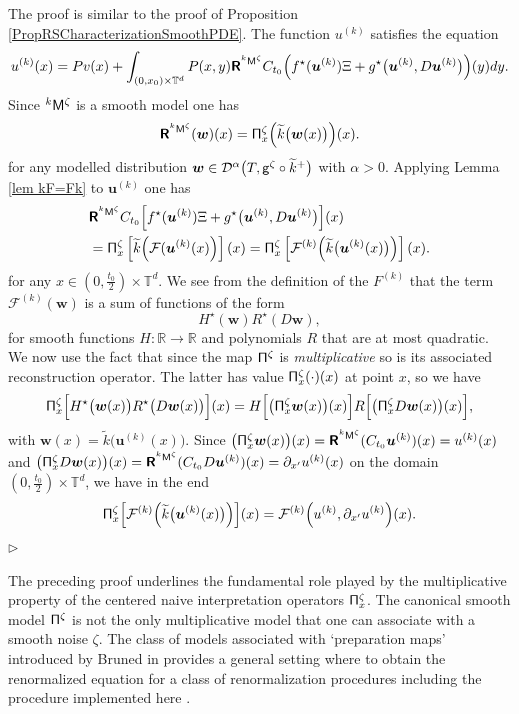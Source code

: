 \documentclass[10pt, reqno]{amsart}
\numberwithin{subsection}{section}
\numberwithin{subsubsection}{subsection}
\numberwithin{equation}{section} %
\newenvironment{Dem}[1][\unskip]{%
    \begin{list}{\hspace{1.15cm}{\sf \textbf{{\small Proof #1 --}}}}{%
        \setlength{\topsep}{0pt}%
        \setlength{\leftmargin}{0pt}%
        \setlength{\rightmargin}{0pt}%
        \setlength{\listparindent}{0pt}%
        \setlength{\itemindent}{0pt}%
        \setlength{\parsep}{0pt}%
        \addtolength{\leftmargin}{0pt}%
        \addtolength{\rightmargin}{0pt}%
    } \item }{\hfill $\rhd$\end{list}\smallskip}
\newenvironment{Rem}[1][\unskip]{%
    \begin{list}{\hspace{1.15cm}{\textsf{\textbf{{\small \textsl{Remark}} 
--}}}}{%
        \setlength{\topsep}{0pt}%
        \setlength{\leftmargin}{0pt}%
        \setlength{\rightmargin}{0pt}%
        \setlength{\listparindent}{0pt}%
        \setlength{\itemindent}{0pt}%
        \setlength{\parsep}{0pt}%
        \addtolength{\leftmargin}{0pt}%
        \addtolength{\rightmargin}{0pt}%
    } \item }{\hfill \end{list}\smallskip}
\theoremstyle{mystyle}
\theoremstyle{mystyle2}
\theoremstyle{mystyle3}
\newcommand{\mcF}{\boldsymbol{p}}
\newcommand{\bsu}{\boldsymbol{u}}
\newcommand{\bsw}{\boldsymbol{w}}
\newcommand\bbR{\mathbb{R}}
\newcommand{\bbT}{\mathbb{T}}
\newcommand{\mcD}{\mathcal{D}}
\renewcommand{\mcF}{\mathcal{F}}
\begin{document}
\begin{Dem}
The proof is similar to the proof of Proposition \ref{PropRSCharacterizationSmoothPDE}. The function $u^{(k)}$ satisfies the equation
\begin{align*}
u^{(k)}(x) = Pv(x)+\int_{(0,x_0)\times\bbT^d} P(x,y) \textbf{\textsf{R}}^{^k{\sf M}^\zeta} C_{t_0}\Big(f^\star(\bsu^{(k)})\Xi + g^\star\big(\bsu^{(k)},D\bsu^{(k)}\big)\Big) (y)dy.
\end{align*}
Since $^k{\sf M}^\zeta$ is a smooth model one has
$$
\textbf{\textsf{R}}^{^k{\sf M}^\zeta}(\bsw) (x) = {\sf \Pi}_x^\zeta\Big(\widetilde{k}\big(\bsw(x)\big)\Big)(x).
$$
for any modelled distribution $\bsw\in\mcD^\alpha\big(T, {\sf g}^\zeta\circ\widetilde{k}^+\big)$ with $\alpha>0$. Applying Lemma \ref{lem kF=Fk} 
to $\bsu^{(k)}$ one has
\begin{align*}
&\textbf{\textsf{R}}^{^k{\sf M}^\zeta}
C_{t_0}\Big[f^\star(\bsu^{(k)})\Xi + g^\star\big(\bsu^{(k)},D\bsu^{(k)}\big)\Big](x) \\
&= {\sf \Pi}_x^\zeta\left[\widetilde{k}\Big(\mcF(\bsu^{(k)}(x)\Big)\right](x) = {\sf\Pi}_x^\zeta\left[\mcF^{(k)}\Big(\widetilde{k}\big(\bsu^{(k)}(x)\big)\Big)\right](x).
\end{align*}
for any $x\in(0,\frac{t_0}2)\times\bbT^d$.
We see from the definition of the $F^{(k)}$ that the term $\mcF^{(k)}(\bsw)$ is a sum of functions of the form
$$
H^\star(\bsw)R^\star(D\bsw),
$$
for smooth functions $H:\bbR\to\bbR$ and polynomials $R$ that are at most 
quadratic. We now use the fact that since the map ${\sf \Pi}^\zeta$ is {\it multiplicative} so is its associated reconstruction operator. 
The latter has value ${\sf\Pi}^\zeta_x(\cdot)(x)$ at point $x$, so we have
$$
{\sf\Pi}_x^\zeta\Big[H^\star\big(\bsw(x)\big)R^\star\big(D\bsw(x)\big)\Big](x) = 
H\Big[\big({\sf\Pi}_x^\zeta\bsw(x)\big)(x)\Big]
R\Big[\big({\sf\Pi}_x^\zeta D\bsw(x)\big)(x)\Big],
$$
with $\bsw(x) = \widetilde{k}\big(\bsu^{(k)}(x)\big)$.
Since $\big({\sf\Pi}_x^\zeta\bsw(x)\big)(x)=\textbf{\textsf{R}}^{^k{\sf M}^\zeta}(C_{t_0}\bsu^{(k)})(x)=u^{(k)}(x)$
and $\big({\sf\Pi}_x^\zeta D\bsw(x)\big)(x)=\textbf{\textsf{R}}^{^k{\sf M}^\zeta}(C_{t_0}D\bsu^{(k)})(x)=\partial_{x'}u^{(k)}(x)$ on the domain $(0,\frac{t_0}2)\times\bbT^d$, we have in the end
$$
{\sf\Pi}_x^\zeta\Big[\mcF^{(k)}\Big(\widetilde{k}\big(\bsu^{(k)}(x)\big)\Big)\Big](x) = \mcF^{(k)}\Big(u^{(k)},\partial_{x'} u^{(k)}\Big)(x).
$$
\end{Dem}

\medskip

{\small {\sl \begin{Rem} 
The preceding proof underlines the fundamental role played by the multiplicative property of the centered naive interpretation operators ${\sf \Pi}^\zeta_x$. The canonical smooth model ${\sf \Pi}^\zeta$ is not the only multiplicative model that one can associate with a smooth noise $\zeta$. The class of models associated with `preparation maps' introduced by Bruned in \cite{BrunedRecursive} provides a general setting where to obtain the renormalized equation for a class of renormalization procedures including the procedure implemented here \cite{BailleulBruned}.
\end{Rem}}}
\end{document}
